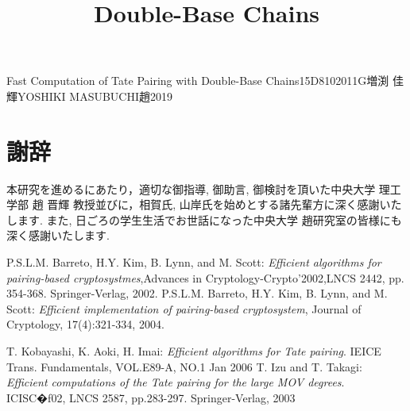 \documentclass[a4j,oneside,openany]{jsbook}
\begin{document}

\title{Double-Base Chains}{Fast Computation of Tate Pairing with Double-Base Chains}{15D8102011G}{増渕 佳輝}{YOSHIKI MASUBUCHI}{趙}{2019}

\setcounter{page}{1}


\newpage

\tableofcontents
\newpage











\chapter*{謝辞}
本研究を進めるにあたり，適切な御指導, 御助言, 御検討を頂いた中央大学 理工学部 趙 晋輝 教授並びに，相賀氏, 山岸氏を始めとする諸先輩方に深く感謝いたします. また, 日ごろの学生生活でお世話になった中央大学 趙研究室の皆様にも深く感謝いたします.


\begin{thebibliography}{99}
	 P.S.L.M. Barreto, H.Y. Kim, B. Lynn, and M. Scott: {\em Efficient algorithms for pairing-based cryptosystmes},Advances in Cryptology-Crypto'2002,LNCS 2442, pp. 354-368. Springer-Verlag, 2002.
	 P.S.L.M. Barreto, H.Y. Kim, B. Lynn, and M. Scott: {\em Efficient implementation of pairing-based cryptosystem}, Journal of Cryptology, 17(4):321-334, 2004.




	 T. Kobayashi, K. Aoki, H. Imai: {\em Efficient algorithms for Tate pairing}. IEICE Trans. Fundamentals, VOL.E89-A, NO.1 Jan 2006
	 T. Izu and T. Takagi: {\em Efficient computations of the Tate pairing for the large MOV degrees}. ICISC�f02, LNCS 2587, pp.283-297. Springer-Verlag, 2003

\end{thebibliography}
\end{document}
